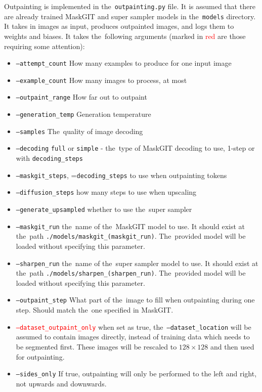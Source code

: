Outpainting is implemented in the~\texttt{outpainting.py} file. It is assumed that there are already trained MaskGIT and super sampler models in the~\texttt{models} directory. It takes in images as input, produces outpainted images, and logs them to weights and biases. It takes the~following arguments (marked in \textcolor{red}{red} are those requiring some attention):
\begin{itemize}
    \item \texttt{--attempt\_count} How many examples to produce for one input image
    \item \texttt{--example\_count} How many images to process, at most
    \item \texttt{--outpaint\_range} How far out to outpaint
    \item \texttt{--generation\_temp} Generation temperature
    \item \texttt{--samples} The~quality of image decoding
    \item \texttt{--decoding} \texttt{full} or \texttt{simple} - the~type of MaskGIT decoding to use, 1-step or with \texttt{decoding\_steps}
    \item \texttt{--maskgit\_steps}, =\texttt{decoding\_steps} to use when outpainting tokens
    \item \texttt{--diffusion\_steps} how many steps to use when upscaling
    \item \texttt{--generate\_upsampled} whether to use the~super sampler
    \item \texttt{--maskgit\_run} the~name of the~MaskGIT model to use. It should exist at the~path \texttt{./models/maskgit\_(maskgit\_run)}. The~provided model will be loaded without specifying this parameter.
    \item \texttt{--sharpen\_run} the~name of the~super sampler model to use. It should exist at the~path \texttt{./models/sharpen\_(sharpen\_run)}. The~provided model will be loaded without specifying this parameter.
    \item \texttt{--outpaint\_step} What part of the~image to fill when outpainting during one step. Should match the~one specified in MaskGIT.
    \item \textcolor{red}{\texttt{--dataset\_outpaint\_only}} when set as true, the~\texttt{--dataset\_location} will be assumed to contain images directly, instead of training data which needs to be segmented first. These images will be rescaled to $128 \times 128$ and then used for outpainting.
    \item \texttt{--sides_only} If true, outpainting will only be performed to the left and right, not upwards and downwards.
\end{itemize}




